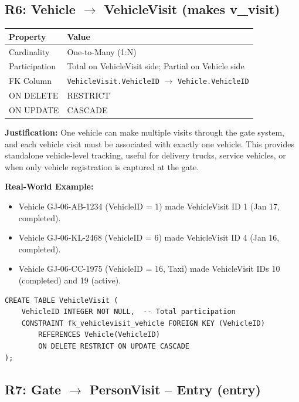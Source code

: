\documentclass[a4paper, 12pt]{article}
\begin{document}
\subsection{R6: Vehicle \texorpdfstring{$\rightarrow$}{->} VehicleVisit (makes v\_visit)}

\begin{table}[H]
\centering
\small
\begin{tabularx}{\textwidth}{l X}
\toprule
\textbf{Property} & \textbf{Value} \\
\midrule
Cardinality & One-to-Many (1:N) \\
Participation & Total on VehicleVisit side; Partial on Vehicle side \\
FK Column & \texttt{VehicleVisit.VehicleID} $\rightarrow$ \texttt{Vehicle.VehicleID} \\
ON DELETE & RESTRICT \\
ON UPDATE & CASCADE \\
\bottomrule
\end{tabularx}
\end{table}

\textbf{Justification:} One vehicle can make multiple visits through the gate system, and each vehicle visit must be associated with exactly one vehicle. This provides standalone vehicle-level tracking, useful for delivery trucks, service vehicles, or when only vehicle registration is captured at the gate.

\textbf{Real-World Example:}
\begin{itemize}[leftmargin=*, nosep]
    \item Vehicle GJ-06-AB-1234 (VehicleID = 1) made VehicleVisit ID 1 (Jan 17, completed).
    \item Vehicle GJ-06-KL-2468 (VehicleID = 6) made VehicleVisit ID 4 (Jan 16, completed).
    \item Vehicle GJ-06-CC-1975 (VehicleID = 16, Taxi) made VehicleVisit IDs 10 (completed) and 19 (active).
\end{itemize}

\begin{lstlisting}[style=sqlstyle, caption={R6 Implementation}, label={lst:r6}]
CREATE TABLE VehicleVisit (
    VehicleID INTEGER NOT NULL,  -- Total participation
    CONSTRAINT fk_vehiclevisit_vehicle FOREIGN KEY (VehicleID)
        REFERENCES Vehicle(VehicleID)
        ON DELETE RESTRICT ON UPDATE CASCADE
);
\end{lstlisting}

\subsection{R7: Gate \texorpdfstring{$\rightarrow$}{->} PersonVisit -- Entry (entry)}
\end{document}
